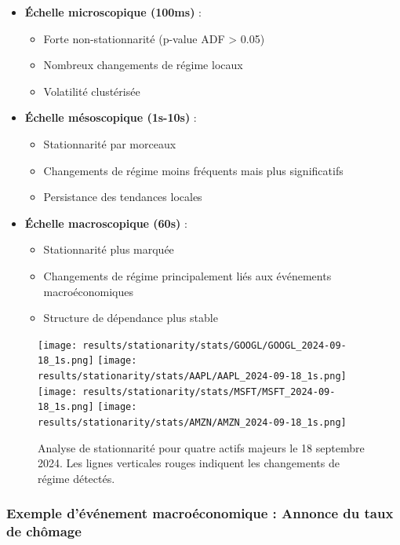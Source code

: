 \documentclass[12pt,a4paper]{article}
\theoremstyle{definition}
\theoremstyle{remark}
\begin{document}
\begin{itemize}
    \item \textbf{Échelle microscopique (100ms)} : 
    \begin{itemize}
        \item Forte non-stationnarité (p-value ADF > 0.05)
        \item Nombreux changements de régime locaux
        \item Volatilité clustérisée
    \end{itemize}
    
    \item \textbf{Échelle mésoscopique (1s-10s)} :
    \begin{itemize}
        \item Stationnarité par morceaux
        \item Changements de régime moins fréquents mais plus significatifs
        \item Persistance des tendances locales
    \end{itemize}
    
    \item \textbf{Échelle macroscopique (60s)} :
    \begin{itemize}
        \item Stationnarité plus marquée
        \item Changements de régime principalement liés aux événements macroéconomiques
        \item Structure de dépendance plus stable
    \end{itemize}
\end{itemize}

\begin{figure}[h!]
    \centering
    \texttt{[image: results/stationarity/stats/GOOGL/GOOGL\_2024-09-18\_1s.png]}
    \texttt{[image: results/stationarity/stats/AAPL/AAPL\_2024-09-18\_1s.png]}
    \texttt{[image: results/stationarity/stats/MSFT/MSFT\_2024-09-18\_1s.png]}
    \texttt{[image: results/stationarity/stats/AMZN/AMZN\_2024-09-18\_1s.png]}
    \caption{Analyse de stationnarité pour quatre actifs majeurs le 18 septembre 2024. Les lignes verticales rouges indiquent les changements de régime détectés.}
    \label{fig:stationarity}
\end{figure}

\subsubsection{Exemple d'événement macroéconomique : Annonce du taux de chômage}
\end{document}
